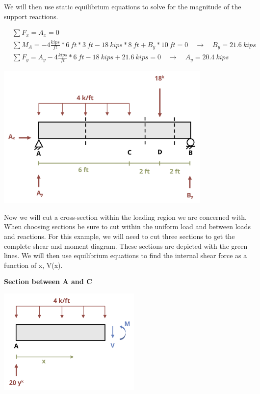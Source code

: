 \documentclass[
  letterpaper,
  DIV=11,
  numbers=noendperiod]{scrreprt}
\begin{document}
\begin{tcolorbox}
\begin{tcolorbox}
We will then use static equilibrium equations to solve for the magnitude
of the support reactions.

\[
\begin{aligned}
&\sum F_x=A_x=0 \\
&\sum M_A=-4\frac{kips}{ft}*6{~ft}*3{~ft}-18{~kips}*8{~ft}+B_y*10{~ft}=0 \quad\rightarrow\quad B_y =21.6{~kips} \\
&\sum F_y=A_y-4\frac{kips}{ft}*6{~ft}-18{~kips}+21.6{~kips}=0 \quad\rightarrow\quad A_y =20.4{~kips}
\end{aligned}
\]

\begin{center}
\includegraphics[width=4.15625in,height=\textheight]{images/CH7 PNGs/example 7.2 part 3.png}
\end{center}

Now we will cut a cross-section within the loading region we are
concerned with. When choosing sections be sure to cut within the uniform
load and between loads and reactions. For this example, we will need to
cut three sections to get the complete shear and moment diagram. These
sections are depicted with the green lines. We will then use equilibrium
equations to find the internal shear force as a function of x, V(x).

\textbf{Section between A and C}

\begin{center}
\includegraphics[width=2.76042in,height=\textheight]{images/CH7 PNGs/example 7.2 part 4.png}
\end{center}


\end{tcolorbox}
\end{tcolorbox}
\end{document}
